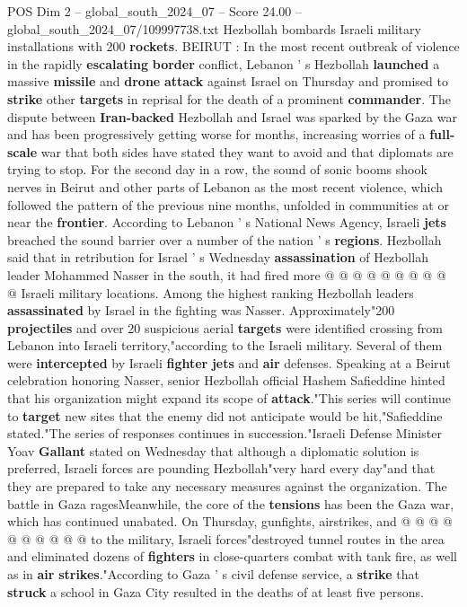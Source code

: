 \begin{textsample}{POS Dim 2 – global\_south\_2024\_07 – Score 24.00 – global\_south\_2024\_07/109997738.txt}  \label{ex:f2_pos_069}
Hezbollah bombards Israeli military installations with 200 \textbf{rockets}.
BEIRUT : In the most recent outbreak of violence in the rapidly \textbf{escalating} \textbf{border} conflict, Lebanon ' s Hezbollah \textbf{launched} a massive \textbf{missile} and \textbf{drone} \textbf{attack} against Israel on Thursday and promised to \textbf{strike} other \textbf{targets} in reprisal for the death of a prominent \textbf{commander}.
The dispute between \textbf{Iran-backed} Hezbollah and Israel was sparked by the Gaza war and has been progressively getting worse for months, increasing worries of a \textbf{full-scale} war that both sides have stated they want to avoid and that diplomats are trying to stop.
For the second day in a row, the sound of sonic booms shook nerves in Beirut and other parts of Lebanon as the most recent violence, which followed the pattern of the previous nine months, unfolded in communities at or near the \textbf{frontier}.
According to Lebanon ' s National News Agency, Israeli \textbf{jets} breached the sound barrier over a number of the nation ' s \textbf{regions}.
Hezbollah said that in retribution for Israel ' s Wednesday \textbf{assassination} of Hezbollah leader Mohammed Nasser in the south, it had fired more @ @ @ @ @ @ @ @ @ @ Israeli military locations.
Among the highest ranking Hezbollah leaders \textbf{assassinated} by Israel in the fighting was Nasser.
Approximately"200 \textbf{projectiles} and over 20 suspicious aerial \textbf{targets} were identified crossing from Lebanon into Israeli territory,"according to the Israeli military.
Several of them were \textbf{intercepted} by Israeli \textbf{fighter} \textbf{jets} and \textbf{air} defenses.
Speaking at a Beirut celebration honoring Nasser, senior Hezbollah official Hashem Safieddine hinted that his organization might expand its scope of \textbf{attack}."This series will continue to \textbf{target} new sites that the enemy did not anticipate would be hit,"Safieddine stated."The series of responses continues in succession."Israeli Defense Minister Yoav \textbf{Gallant} stated on Wednesday that although a diplomatic solution is preferred, Israeli forces are pounding Hezbollah"very hard every day"and that they are prepared to take any necessary measures against the organization.
The battle in Gaza ragesMeanwhile, the core of the \textbf{tensions} has been the Gaza war, which has continued unabated.
On Thursday, gunfights, airstrikes, and @ @ @ @ @ @ @ @ @ @ to the military, Israeli forces"destroyed tunnel routes in the area and eliminated dozens of \textbf{fighters} in close-quarters combat with tank fire, as well as in \textbf{air} \textbf{strikes}."According to Gaza ' s civil defense service, a \textbf{strike} that \textbf{struck} a school in Gaza City resulted in the deaths of at least five persons.

\end{textsample}

